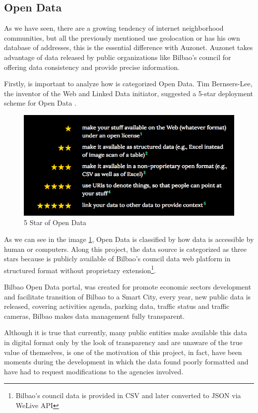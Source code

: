 \documentclass{DeustoFDP}
\begin{document}
\subsection{Open Data}
As we have seen, there are a growing tendency of internet neighborhood communities, but all the previously mentioned use geolocation or has his own database of addresses, this is the essential difference with Auzonet. Auzonet takes advantage of data released by public organizations like Bilbao's council for offering data consistency and provide precise information.

Firstly, is important to analyze how is categorized Open Data. Tim Bernsers-Lee, the inventor of the Web and Linked Data initiator, suggested a 5-star deployment scheme for Open Data \cite{ODStars}.

\begin{figure}[h]
\centering
\includegraphics[width=0.7\linewidth]{fig/5starod}
\caption[5 Star of Open Data]{5 Star of Open Data}
\label{fig:5starod}
\end{figure}

As we can see in the image \ref{fig:5starod}, Open Data is classified by how data is accessible by human or computers. Along this project, the data source is categorized as three stars because is publicly available of Bilbao's council data web platform \cite{BilbaoOpenData} in structured format without proprietary extension\footnote{Bilbao's council data is provided in CSV and later converted to JSON via WeLive API}. 

Bilbao Open Data portal, was created for promote economic sectors development and facilitate transition of Bilbao to a Smart City, every year, new public data is released, covering activities agenda, parking data, traffic status and traffic cameras, Bilbao makes data management fully transparent.

Although it is true that currently, many public entities make available this data in digital format only by the look of transparency and are unaware of the true value of themselves, is one of the motivation of this project, in fact, have been moments during the development in which the data found poorly formatted and have had to request modifications to the agencies involved.
\end{document}
